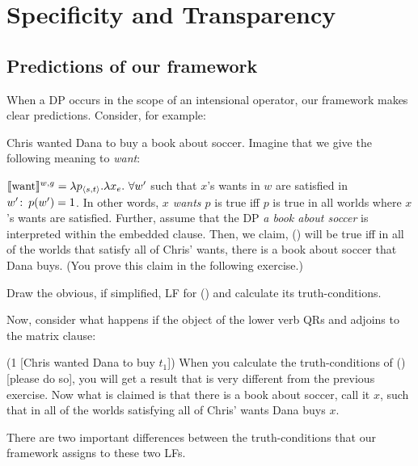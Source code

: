 \chapter{Specificity and Transparency}


\minitoc

\section{Predictions of our framework}
\label{sec:predictions}

When a DP occurs in the scope of an intensional operator, our framework makes
clear predictions. Consider, for example:

\ex
Chris wanted Dana to buy a book about soccer.
\xe
%
Imagine that we give the following meaning to \emph{want}:

\ex
$\llbracket \mbox{want} \rrbracket^{w,g} = \lambda p_{\langle s,t \rangle}.\lambda x_e.\ \forall w'$ such that
$x$'s wants in $w$ are satisfied in $w'\colon\thinspace p(w')=1$. 
\xe
%
In other words, \emph{$x$ wants $p$} is true iff $p$ is true in all worlds where
$x$'s wants are satisfied. Further, assume that the DP \emph{a book about
  soccer} is interpreted within the embedded clause. Then, we claim, (\blastx)
will be true iff in all of the worlds that satisfy all of Chris' wants, there is
a book about soccer that Dana buys. (You prove this claim in the following
exercise.)

\begin{exercise}
  Draw the obvious, if simplified, LF for (\blastx) and calculate its
  truth-conditions. \eex
\end{exercise}
%
Now, consider what happens if the object of the lower verb QRs and adjoins to
the matrix clause:

\ex{} (1 [Chris wanted Dana to buy $t_1$])
\xe
%
When you calculate the truth-conditions of (\lastx) [please do so], you will get
a result that is very different from the previous exercise. Now what is claimed
is that there is a book about soccer, call it $x$, such that in all of the
worlds satisfying all of Chris' wants Dana buys $x$.

There are two important differences between the truth-conditions that our framework
assigns to these two LFs.


